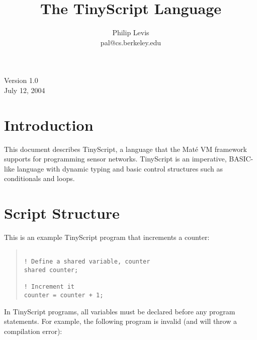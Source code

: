 \documentclass[12pt]{article}
\title{The TinyScript Language}
\author{Philip Levis\\pal@cs.berkeley.edu}
\date{}
\newcommand{\mate}{Mat\'{e}\xspace}
\begin{document}

\maketitle
\vspace{2in}
\begin{center}
Version 1.0\\
July 12, 2004
\end{center}

\fontsize{10}{10}                               %


\thispagestyle{empty}
\newpage
\tableofcontents
\newpage

\section{Introduction}

This document describes TinyScript, a language that the \mate VM
framework supports for programming sensor networks. TinyScript is an
imperative, BASIC-like language with dynamic typing and basic control
structures such as conditionals and loops. 

\section{Script Structure}
\label{sec:tinyscript}

This is an example TinyScript program that increments a counter:

\begin{quotation}
\begin{verbatim}

! Define a shared variable, counter
shared counter;

! Increment it
counter = counter + 1;

\end{verbatim}
\end{quotation}

In TinyScript programs, all variables must be declared before any
program statements. For example, the following program is invalid (and
will throw a compilation error):
\end{document}
